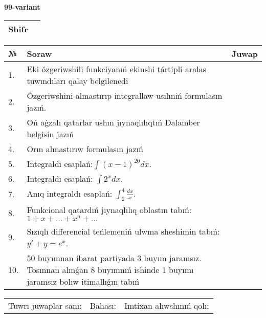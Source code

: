 \documentclass{article}
\begin{document}
  \egroup
  
  \newpage
  
  
  \textbf{99-variant}\\
  
  \bgroup
  \def\arraystretch{1.6} %
  
  \begin{tabular}{|m{5.7cm}|m{9.5cm}|}
  \hline
  Shifr & \\
  \hline
  \end{tabular}
  
  \vspace{1cm}
  
  \begin{tabular}{|m{0.7cm}|m{10cm}|m{4cm}|}
  \hline
  № & Soraw & Juwap \\
  \hline
  1. & Eki ózgeriwshili funkciyanıń ekinshi tártipli aralas tuwındıları qalay belgilenedi &  \\
  \hline
  2. & Ózgeriwshini almastırıp integrallaw usılıniń formulasın jazıń. &  \\
  \hline
  3. & Oń aǵzalı qatarlar ushın jıynaqlılıqtıń Dalamber belgisin jazıń &  \\
  \hline
  4. & Orın almastırıw formulasın jazıń &  \\
  \hline
  5. & Integraldı esaplań:\(\int{(x - 1)^{20}}dx\). &  \\
  \hline
  6. & Integraldı esaplań: \(\int{2^{x}dx}\). &  \\
  \hline
  7. & Anıq integraldı esaplań: \(\int_{2}^{4}\frac{dx}{x}\). &  \\
  \hline
  8. & Funkcional qatardıń jıynaqlılıq oblastın tabıń:\(1 + x + ... + x^{n} + ...\) &  \\
  \hline
  9. & Sızıqlı differencial teńlemeniń ulwma sheshimin tabıń: \(y' + y = e^{x}\). &  \\
  \hline
  10. & 50 buyımnan ibarat partiyada 3 buyım jaramsız. Tosınnan alınǵan 8 buyımnıń ishinde 1 buyımı jaramsız bolıw itimallıǵın tabıń &  \\
  \hline
  \end{tabular}
  
  \vspace{1cm}
  
  \begin{tabular}{lll}
  Tuwrı juwaplar sanı: \underline{\hspace{1.5cm}} & 
  Bahası: \underline{\hspace{1.5cm}} & 
  Imtixan alıwshınıń qolı: \underline{\hspace{2cm}} \\
  \end{tabular}
  
\end{document}

